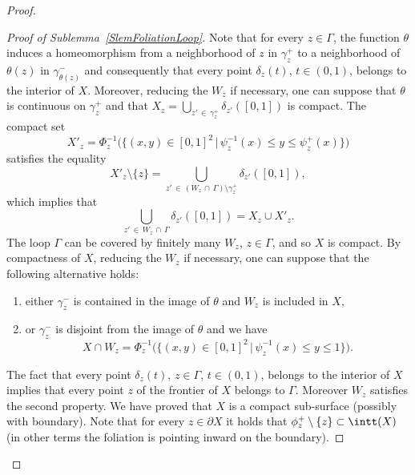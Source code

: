 \begin{proof}
\begin{proof}[Proof of Sublemma~\ref{SlemFoliationLoop}]
Note that for every $z\in\Gamma$, the function $\theta$ induces a homeomorphism from a neighborhood of $z$ in $\gamma_z^{+}$ to a neighborhood of $\theta(z)$ in $\gamma_{\theta(z)}^{-}$ and consequently that every point $\delta_z(t)$, $ t\in(0,1)$, belongs to the interior of $X$. Moreover, reducing the $W_z$ if necessary, one can suppose that $\theta$ is continuous on $\gamma_z^{+}$ and that $X_z=\bigcup_{z'\,\in\,\gamma_z^{+}} \delta_{z'}([0,1])$ is compact. The compact set
\[
X'_z=\Phi^{-1}_z\Big(\big\{(x,y)\in[0,1]^2\,\big|\, \psi_{z}^{-1}(x)\leq y\leq \psi_z^{+}(x)\big\}\Big)
\]
satisfies the equality
\[
X'_z\setminus\{z\}= \bigcup_{z'\,\in\,(W_z\,\cap\,\Gamma)\setminus \gamma_z^{+}} \delta_{z'}([0,1]),
\]
which implies that
\[
\bigcup_{z'\,\in\,W_z\,\cap\,\Gamma} \delta_{z'}([0,1])= X_z\cup X'_z.
\]
The loop $\Gamma$ can be covered by finitely many $W_z$, $z\in\Gamma$, and so $X$ is compact. By compactness of $X$, reducing the $W_z$ if necessary, one can suppose that the following alternative holds:
\begin{enumerate}
\item either $\gamma^-_z$ is contained in the image of $\theta$ and $W_z$ is included in $X$,

\item or $\gamma^-_z$ is disjoint from the image of $\theta$ and we have
\[
X\cap W_z=\Phi^{-1}_z\Big(\big\{(x,y)\in[0,1]^2\,\big|\, \psi_{z}^{-1}(x)\leq y\leq 1\big\}\Big).
\]
\end{enumerate}
The fact that every point $\delta_z(t)$, $z\in\Gamma$, $ t\in(0,1)$, belongs to the interior of $X$ implies that every point $z$ of the frontier of $X$ belongs to $\Gamma$. Moreover $W_z$ satisfies the second property. We have proved that $X$ is a compact sub-surface (possibly with boundary). Note that for every $z\in\partial X$ it holds that $\phi_z^+\setminus\{z\}\subset \intt(X)$ (in other terms the foliation is pointing inward on the boundary).


\end{proof}
\end{proof}
